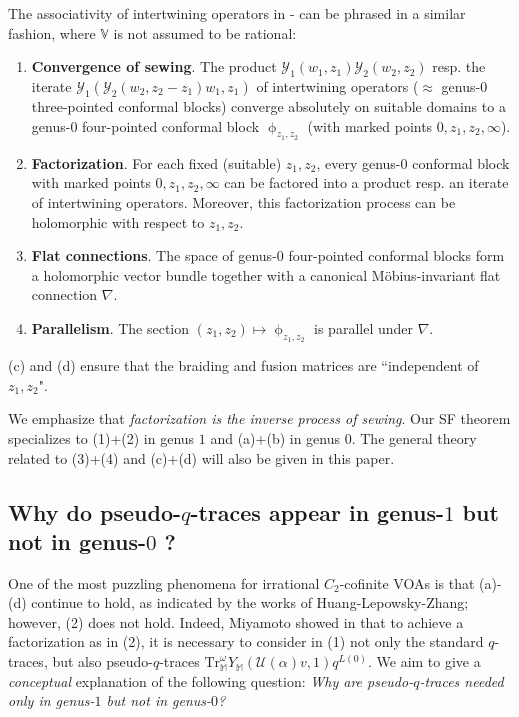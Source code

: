 \documentclass[11pt,b5paper,notitlepage]{article}
\theoremstyle{definition}
\theoremstyle{plain}
\newcommand{\mc}{\mathcal}
\newcommand{\Tr}{\mathrm{Tr}}
\newcommand{\Vbb}{\mathbb V}
\newcommand{\Mbb}{\mathbb M}
\newcommand{\<}{\left\langle}
\renewcommand{\>}{\right\rangle}
\numberwithin{equation}{section}
\begin{document}
The associativity of intertwining operators in \cite{HLZ1,HLZ2}-\cite{HLZ8} can be phrased in a similar fashion, where $\Vbb$ is not assumed to be rational:

\begin{enumerate}[label=(\alph*)]
\item \textbf{Convergence of sewing}. The product $\mc Y_1(w_1,z_1)\mc Y_2(w_2,z_2)$ resp. the iterate $\mc Y_1(\mc Y_2(w_2,z_2-z_1)w_1,z_1)$ of intertwining operators ($\approx$ genus-$0$ three-pointed conformal blocks) converge absolutely on suitable domains to a genus-$0$ four-pointed conformal block $\upphi_{z_1,z_2}$ (with marked points $0,z_1,z_2,\infty$).
\item \textbf{Factorization}. For each fixed (suitable) $z_1,z_2$, every genus-$0$ conformal block with marked points $0,z_1,z_2,\infty$ can be factored into a product resp. an iterate of intertwining operators. Moreover, this factorization process can be holomorphic with respect to $z_1,z_2$.
\item \textbf{Flat connections}. The space of  genus-$0$ four-pointed conformal blocks form a holomorphic vector bundle together with a canonical M\"obius-invariant flat connection $\nabla$. 
\item \textbf{Parallelism}. The section $(z_1,z_2)\mapsto \upphi_{z_1,z_2}$ is parallel under $\nabla$.
\end{enumerate}
(c) and (d) ensure that the braiding and fusion matrices are ``independent of $z_1,z_2$". 

We emphasize that \textit{factorization is the inverse process of sewing}. Our SF theorem specializes to (1)+(2) in genus $1$ and (a)+(b) in genus $0$. The general theory related to (3)+(4) and (c)+(d) will also be given in this paper. 




\subsection{Why do pseudo-$q$-traces appear in genus-$1$ but not in genus-$0$ ?}\label{lbb60}



One of the most puzzling phenomena for irrational $C_2$-cofinite VOAs is that (a)-(d) continue to hold, as indicated by the works of Huang-Lepowsky-Zhang; however, (2) does not hold. Indeed, Miyamoto showed in \cite{Miy-modular-invariance} that to achieve a factorization as in (2), it is necessary to consider in (1) not only the standard $q$-traces, but also pseudo-$q$-traces $\Tr_\Mbb^\omega Y_\Mbb(\mc U(\alpha)v,1)q^{L(0)}$. We aim to give a \textit{conceptual} explanation of the following question: \textit{Why are pseudo-$q$-traces needed only in genus-$1$ but not in genus-$0$?}
\end{document}
